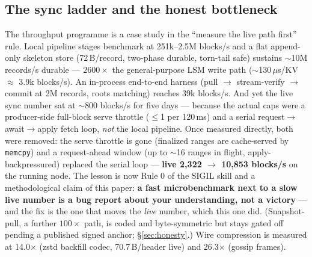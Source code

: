 \documentclass[10pt,a4paper]{article}
\newcommand{\measured}[1]{\textcolor{sigilcyan}{\textbf{#1}}}
\begin{document}
\subsection{The sync ladder and the honest bottleneck}\label{sec:sync}

The throughput programme is a case study in the ``measure the live path first'' rule.
Local pipeline stages benchmark at 251k--2.5M blocks/s and a flat append-only skeleton
store (72\,B/record, two-phase durable, torn-tail safe) sustains $\sim$10M records/s
durable — $2600\times$ the general-purpose LSM write path ($\sim$130\,$\mu$s/KV
$\approx$ 3.9k blocks/s). An in-process end-to-end harness (pull $\to$ stream-verify
$\to$ commit at 2M records, roots matching) reaches 39k blocks/s. And yet the live sync
number sat at $\sim$800 blocks/s for five days — because the actual caps were a
producer-side full-block serve throttle ($\le$1 per 120\,ms) and a serial
request$\to$await$\to$apply fetch loop, \emph{not} the local pipeline. Once measured
directly, both were removed: the serve throttle is gone (finalized ranges are
cache-served by \texttt{memcpy}) and a request-ahead window (up to $\sim$16 ranges in
flight, apply-backpressured) replaced the serial loop — \measured{live 2{,}322 $\to$
10{,}853 blocks/s} on the running node. The lesson is now Rule 0 of the SIGIL skill and a
methodological claim of this paper: \textbf{a fast microbenchmark next to a slow live
number is a bug report about your understanding, not a victory} — and the fix is the one
that moves the \emph{live} number, which this one did. (Snapshot-pull, a further
$100\times$ path, is coded and byte-symmetric but stays gated off pending a published
signed anchor; \S\ref{sec:honesty}.) Wire compression is measured at 14.0$\times$ (zstd
backfill codec, 70.7\,B/header live) and 26.3$\times$ (gossip frames).
\end{document}
